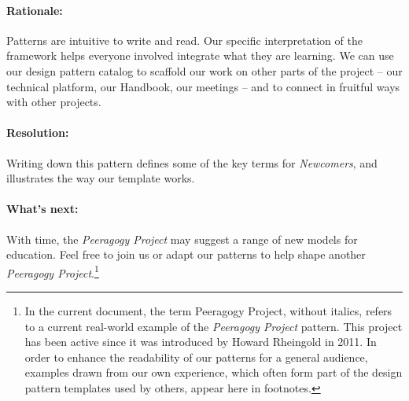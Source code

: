\paragraph{Rationale:}
Patterns are intuitive to write and read. Our specific interpretation of the framework helps everyone involved integrate what they are learning.  We can use our design pattern catalog to scaffold our work on other parts of the project -- our technical platform, our Handbook, our meetings -- and to connect in fruitful ways with other projects.  

\paragraph{Resolution:}  
Writing down this pattern defines some of the key terms for \emph{Newcomers}, and illustrates the way our template works. 

\paragraph{What's next:} 
With time, the \emph{Peeragogy Project} may suggest a range of new models for education. Feel free to join us or adapt our patterns to help shape another \emph{Peeragogy Project}.\footnote{In the current document, the term Peeragogy Project, without italics, refers to a current real-world example of the \emph{Peeragogy Project} pattern. This project has been active since it was introduced by Howard Rheingold in 2011. In order to enhance the readability of our patterns for a general audience, examples drawn from our own experience, which often form part of the design pattern templates used by others, appear here in footnotes.}